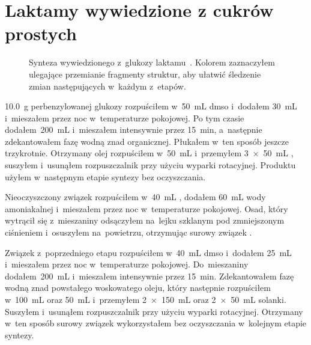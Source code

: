 \section{Laktamy wywiedzione z cukrów prostych}\label{experimental:lactams}
\begin{figure}
	
	\caption{
		Synteza wywiedzionego z~glukozy laktamu~.
		Kolorem zaznaczyłem ulegające przemianie fragmenty struktur,
			aby ułatwić śledzenie zmian następujących w~każdym z~etapów.
	} \label{sch:gluco-synthesis}
\end{figure}
\SI{10.0}{\gram} perbenzylowanej glukozy rozpuściłem w~\SI{50}{\mL} \gls{dmso}
	i~dodałem \SI{30}{\mL}  i~mieszałem przez noc w~temperaturze pokojowej.
Po tym czasie dodałem~\SI{200}{\mL}  i~mieszałem intensywnie przez \SI{15}{\minute},
	a~następnie zdekantowałem fazę wodną znad organicznej.
Płukałem w~ten sposób jeszcze trzykrotnie.
Otrzymany olej rozpuściłem w~\SI{50}{\mL}  i~przemyłem 
	\SI[product-units = single]{3 x 50}{\mL} , suszyłem  i~usunąłem rozpuszczalnik
	przy użyciu wyparki rotacyjnej.
Produktu użyłem w~następnym etapie syntezy bez oczyszczania.

Nieoczyszczony związek  rozpuściłem w~\SI{40}{\mL} ,
	dodałem \SI{60}{\mL} wody amoniakalnej i~mieszałem przez noc w~temperaturze pokojowej.
Osad, który wytrącił się z~mieszaniny odsączyłem na~lejku szklanym pod zmniejszonym ciśnieniem
	i~osuszyłem na~powietrzu, otrzymując surowy związek .

Związek  z~poprzedniego etapu rozpuściłem w~\SI{40}{\mL} \gls{dmso}
	i~dodałem \SI{25}{\mL}  i~mieszałem przez noc w~temperaturze pokojowej.
Do~mieszaniny dodałem~\SI{200}{\mL}  i~mieszałem intensywnie przez \SI{15}{\minute}.
Zdekantowałem fazę wodną znad powstałego woskowatego oleju, który następnie rozpuściłem
	w~\SI{100}{\mL}  oraz \SI{50}{\mL}  i~przemyłem
	\SI[product-units = single]{2 x 150}{\mL}  oraz
	\SI[product-units = single]{2 x 50}{\mL} solanki.
Suszyłem  i~usunąłem rozpuszczalnik przy użyciu wyparki rotacyjnej.
Otrzymany w~ten sposób surowy związek  wykorzystałem bez oczyszczania
	w~kolejnym etapie syntezy.

